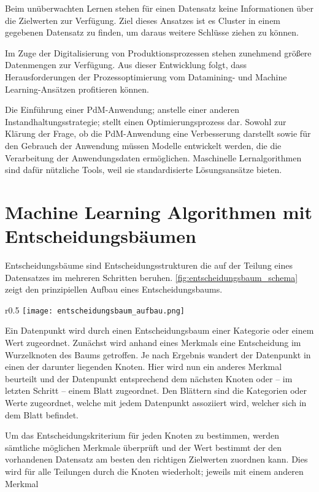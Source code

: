 Beim unüberwachten Lernen stehen für einen Datensatz keine Informationen über die Zielwerten zur Verfügung. Ziel dieses Ansatzes ist es Cluster in einem gegebenen Datensatz zu finden, um daraus weitere Schlüsse ziehen zu können.

Im Zuge der Digitalisierung von Produktionsprozessen stehen zunehmend größere Datenmengen zur Verfügung. Aus dieser Entwicklung folgt, dass Herausforderungen der Prozessoptimierung vom Datamining- und Machine Learning-Ansätzen profitieren können.~\cite[S.~35]{Schafer.2019}

Die Einführung einer PdM-Anwendung; anstelle einer anderen Instandhaltungsstrategie; stellt einen Optimierungsprozess dar. Sowohl zur Klärung der Frage, ob die PdM-Anwendung eine Verbesserung darstellt sowie für den Gebrauch der Anwendung müssen Modelle entwickelt werden, die die Verarbeitung der Anwendungsdaten ermöglichen. Maschinelle Lernalgorithmen sind dafür nützliche Tools, weil sie standardisierte Lösungsansätze bieten.
\section{Machine Learning Algorithmen mit Entscheidungsbäumen}
\label{sec:algorithmen_mit_entscheidungsbaum}
Entscheidungsbäume sind Entscheidungsstrukturen die auf der Teilung eines Datensatzes im mehreren Schritten beruhen. \cref{fig:entscheidungsbaum_schema} zeigt den prinzipiellen Aufbau eines Entscheidungsbaums.

\begin{wrapfigure}{r}{0.5\textwidth}
	\centering
	\texttt{[image: entscheidungsbaum\_aufbau.png]}
	\caption{Schematische Darstellung eines Entscheidungsbaums}
	\label{fig:entscheidungsbaum_schema}
\end{wrapfigure}

Ein Datenpunkt wird durch einen Entscheidungsbaum einer Kategorie oder einem Wert zugeordnet. Zunächst wird anhand eines Merkmals eine Entscheidung im Wurzelknoten des Baums getroffen. Je nach Ergebnis wandert der Datenpunkt in einen der darunter liegenden Knoten. Hier wird nun ein anderes Merkmal beurteilt und der Datenpunkt entsprechend dem nächsten Knoten oder -- im letzten Schritt -- einem Blatt zugeordnet. Den Blättern sind die Kategorien oder Werte zugeordnet, welche mit jedem Datenpunkt assoziiert wird, welcher sich in dem Blatt befindet. 

Um das Entscheidungskriterium für jeden Knoten zu bestimmen, werden sämtliche möglichen Merkmale überprüft und der Wert bestimmt der den vorhandenen Datensatz am besten den richtigen Zielwerten zuordnen kann. Dies wird für alle Teilungen durch die Knoten wiederholt; jeweils mit einem anderen Merkmal~\cite{Muller.2017}

